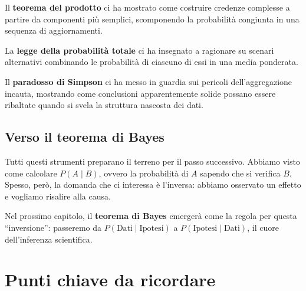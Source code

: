 \documentclass[
  italian,
  letterpaper,
  a4paper,
  11pt,
  open=any]{scrbook}
\theoremstyle{plain}
\theoremstyle{definition}
\theoremstyle{definition}
\theoremstyle{remark}
\begin{document}
Il \textbf{teorema del prodotto} ci ha mostrato come costruire credenze
complesse a partire da componenti più semplici, scomponendo la
probabilità congiunta in una sequenza di aggiornamenti.

La \textbf{legge della probabilità totale} ci ha insegnato a ragionare
su scenari alternativi combinando le probabilità di ciascuno di essi in
una media ponderata.

Il \textbf{paradosso di Simpson} ci ha messo in guardia sui pericoli
dell'aggregazione incauta, mostrando come conclusioni apparentemente
solide possano essere ribaltate quando si svela la struttura nascosta
dei dati.

\subsection{Verso il teorema di Bayes}\label{verso-il-teorema-di-bayes}

Tutti questi strumenti preparano il terreno per il passo successivo.
Abbiamo visto come calcolare \(P(A \mid B)\), ovvero la probabilità di
\(A\) sapendo che si verifica \(B\). Spesso, però, la domanda che ci
interessa è l'inversa: abbiamo osservato un effetto e vogliamo risalire
alla causa.

Nel prossimo capitolo, il \textbf{teorema di Bayes} emergerà come la
regola per questa ``inversione'': passeremo da
\(P(\text{Dati} \mid \text{Ipotesi})\) a
\(P(\text{Ipotesi} \mid \text{Dati})\), il cuore dell'inferenza
scientifica.

\section*{Punti chiave da ricordare}\label{punti-chiave-da-ricordare-3}

\end{document}
